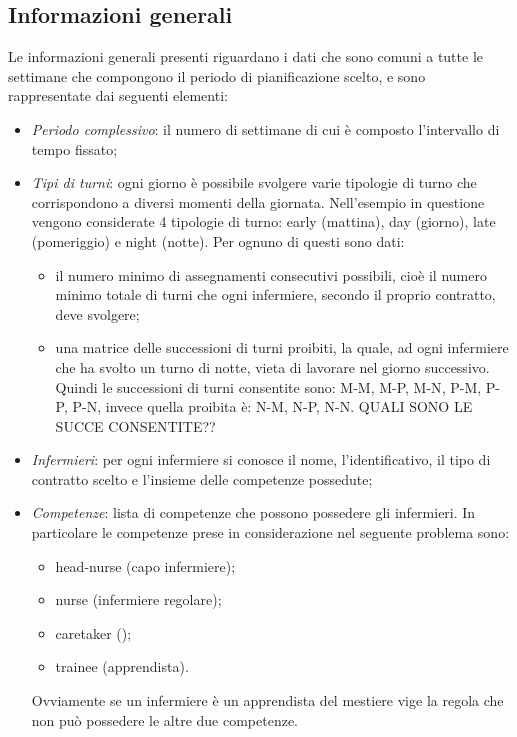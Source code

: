 \subsection{Informazioni generali}
Le informazioni generali presenti riguardano i dati che sono comuni a tutte le settimane che compongono il periodo di pianificazione scelto, e sono rappresentate dai seguenti elementi:
\begin{itemize}

\item \textit{Periodo complessivo}: il numero di settimane di cui è composto l'intervallo di tempo fissato;

\item \textit{Tipi di turni}: ogni giorno è possibile svolgere varie tipologie di turno che corrispondono a diversi momenti della giornata. Nell'esempio in questione vengono considerate 4 tipologie di turno: early (mattina), day (giorno), late (pomeriggio) e night (notte). Per ognuno di questi sono dati:
\begin{itemize}
\item il numero minimo di assegnamenti consecutivi possibili, cioè il numero minimo totale di turni che ogni infermiere, secondo il proprio contratto, deve svolgere;
\item una matrice delle successioni di turni proibiti, la quale, ad ogni infermiere che ha svolto un turno di notte, vieta di lavorare nel giorno successivo.
Quindi le successioni di turni consentite sono: {M-M, M-P, M-N}, {P-M, P-P, P-N},
invece quella proibita è: {N-M, N-P, N-N}. QUALI SONO LE SUCCE CONSENTITE??
\end{itemize}

\item \textit{Infermieri}: per ogni infermiere si conosce il nome, l'identificativo, il tipo di contratto scelto e l'insieme delle competenze possedute;

\item \textit{Competenze}: lista di competenze che possono possedere gli infermieri. In particolare le competenze prese in considerazione nel seguente problema sono:
\begin{itemize}
\item head-nurse (capo infermiere);
\item nurse (infermiere regolare);
\item caretaker ();
\item trainee (apprendista).
\end{itemize}
Ovviamente se un infermiere è un apprendista del mestiere vige la regola che non può possedere le altre due competenze.


\end{itemize}
